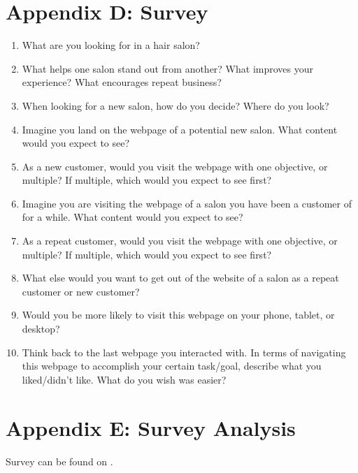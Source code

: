 \section{Appendix D: Survey}
\begin{enumerate}
\item
  What are you looking for in a hair salon?
\item
  What helps one salon stand out from another? What improves your experience? What encourages repeat business?
\item
  When looking for a new salon, how do you decide? Where do you look?
\item
  Imagine you land on the webpage of a potential new salon. What content would you expect to see?
\item
  As a new customer, would you visit the webpage with one objective, or multiple? If multiple, which would you expect to see first?
\item
  Imagine you are visiting the webpage of a salon you have been a customer of for a while. What content would you expect to see?
\item
  As a repeat customer, would you visit the webpage with one objective, or multiple? If multiple, which would you expect to see first?
\item
  What else would you want to get out of the website of a salon as a repeat customer or new customer?
\item
  Would you be more likely to visit this webpage on your phone, tablet, or desktop?
\item
  Think back to the last webpage you interacted with. In terms of navigating this webpage to accomplish your certain task/goal, describe what you liked/didn't like. What do you wish was easier?
\end{enumerate}


\section{Appendix E: Survey Analysis}

Survey can be found on .

